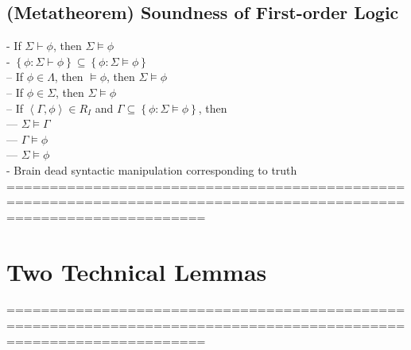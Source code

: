 \documentclass{book}
\newcommand{\set}[1]{\left\{ #1 \right\}}
\newcommand{\seq}[1]{\left\langle #1 \right\rangle}
\begin{document}
\subsection{(Metatheorem) Soundness of First-order Logic} %
	- If $\Sigma \vdash \phi$, then $\Sigma \vDash \phi$ \\
	- $\set{\phi: \Sigma \vdash \phi} \subseteq \set{\phi: \Sigma \vDash \phi}$ \\
		-- If $\phi \in \Lambda$, then $\vDash \phi$, then $\Sigma \vDash \phi$ \\
		-- If $\phi \in \Sigma$, then $\Sigma \vDash \phi$ \\ 
		-- If $\seq{\Gamma, \phi} \in R_I$ and $\Gamma \subseteq \set{\phi: \Sigma \vDash \phi}$, then \\
			--- $\Sigma \vDash \Gamma$ \\
			--- $\Gamma \vDash \phi$ \\
			--- $\Sigma \vDash \phi$ \\
	- Brain dead syntactic manipulation corresponding to truth \\
	===================================================================================================================

\section{Two Technical Lemmas}
	===================================================================================================================
\end{document}
